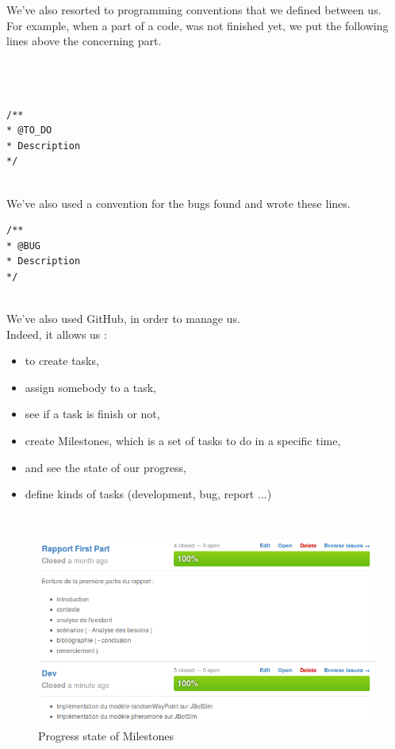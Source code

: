 We've also resorted to programming conventions that we defined between us.\\
For example, when a part of a code, was not finished yet, we put the following lines above the concerning part.\\\\\\\\

\begin{lstlisting}[frame=trBL, title=Programming convention for unfinished code]
/**
* @TO_DO
* Description
*/
\end{lstlisting}
~\\

We've also used a convention for the bugs found and wrote these lines.\\

\begin{lstlisting}[frame=trBL, title=Programming convention for bugs]
/**
* @BUG
* Description
*/
\end{lstlisting}
~\\

We've also used GitHub, in order to manage us.\\
Indeed, it allows us :\\

\begin{itemize}
\item to create tasks, 
\item assign somebody to a task, 
\item see if a task is finish or not,
\item create Milestones, which is a set of tasks to do in a specific time, 
\item and see the state of our progress,
\item define kinds of tasks (development, bug, report ...)
\end{itemize}
~\\

\begin{figure}[!h]
\caption{\label{Milestones}Progress state of Milestones}
   \includegraphics[scale=0.7]{../images/Milestones.png}
\end{figure}

